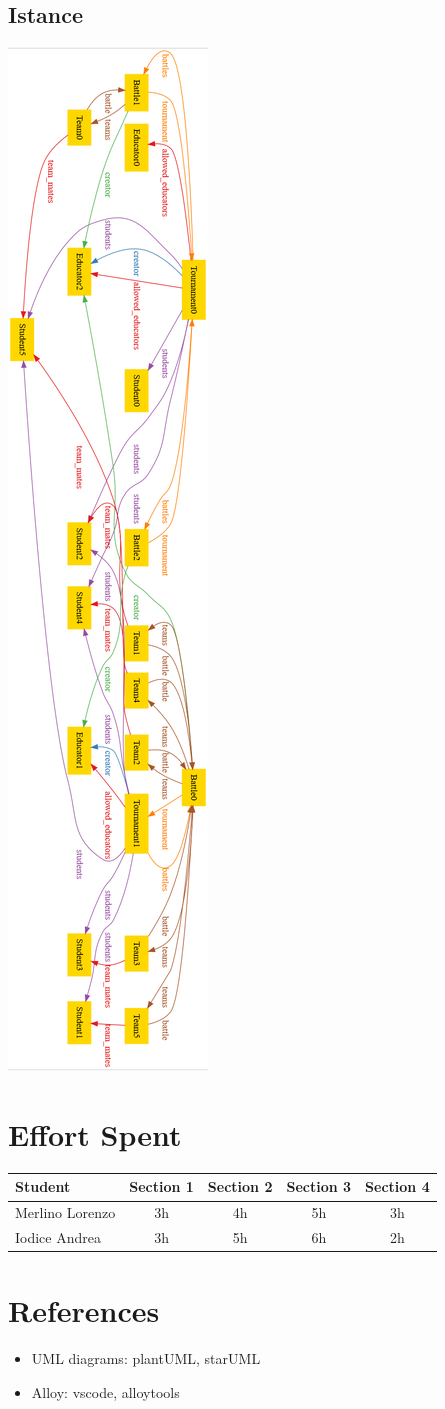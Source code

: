 \documentclass{article}
\begin{document}
\subsection{Istance}
\begin{center}
  \includegraphics[width=0.25\linewidth]{istance.png}
\label{fig:instance}
\end{center}

\newpage
\section{Effort Spent}
\begin{center}
\begin{tabular}{||l|c|c|c|c||}
\hline
Student & Section 1 & Section 2 & Section 3 & Section 4
\\
\hline
Merlino Lorenzo & 3h & 4h & 5h & 3h
\\
\hline
Iodice Andrea & 3h & 5h & 6h & 2h
\\
\hline
\end{tabular}
\end{center}

\newpage
\section{References}
\begin{itemize}
\item UML diagrams: plantUML, starUML
\item Alloy: vscode, alloytools
\end{itemize}
\end{document}
